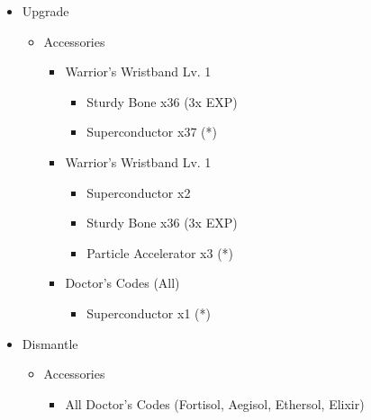 \begin{multicols}{2}
\begin{upgrade}
\begin{itemize}
    \item Upgrade
    \begin{itemize}
        \item Accessories
        \begin{itemize}
            \item Warrior's Wristband Lv. 1
            \begin{itemize}
                \item Sturdy Bone x36 (3x EXP)
                \item Superconductor x37 (*)
            \end{itemize}
            \item Warrior's Wristband Lv. 1
            \begin{itemize}
                \item Superconductor x2
                \item Sturdy Bone x36 (3x EXP)
                \item Particle Accelerator x3 (*)
            \end{itemize}
            \item Doctor's Codes (All)
            \begin{itemize}
                \item Superconductor x1 (*)
            \end{itemize}
        \end{itemize}
    \end{itemize}
    \item Dismantle
    \begin{itemize}
        \item Accessories
        \begin{itemize}
            \item All Doctor's Codes (Fortisol, Aegisol, Ethersol, Elixir)
        \end{itemize}
    \end{itemize}
\end{itemize}
\end{upgrade}
\end{multicols}
\renewcommand{\first}{[1] Riot Shield (\syn/\sen/\rav)}
\renewcommand{\second}{[2] Relentless Assault (\com/\rav/\rav)}
\renewcommand{\third}{[3] Mystic Tower (\rav/\sen/\rav)}
\renewcommand{\fourth}{[4] Aggression (\com/\com/\rav)}
\renewcommand{\fifth}{[5] Matador (\rav/\sen/\sab)}
\renewcommand{\sixth}{[6] Aggression (\com/\com/\rav)}

